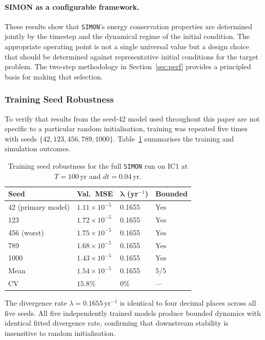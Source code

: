 \documentclass[12pt]{article}
\begin{document}
\paragraph{SIMON as a configurable framework.}
These results show that \texttt{SIMON}'s energy conservation
properties are determined jointly by the timestep and the dynamical
regime of the initial condition. The appropriate operating point is
not a single universal value but a design choice that should be
determined against representative initial conditions for the target
problem. The two-step methodology in Section~\ref{sec:perf} provides
a principled basis for making that selection.

\subsubsection{Training Seed Robustness}
\label{sec:seed_robustness}

To verify that results from the seed-42 model used throughout this paper are
not specific to a particular random initialisation, training was repeated five times
with seeds $\{42, 123, 456, 789, 1000\}$. Table~\ref{tab:seeds} summarises the
training and simulation outcomes.

\begin{table}[H]
\centering
\caption{Training seed robustness for the full \texttt{SIMON} run on IC1 at $T=100$\,yr and $dt=0.04$\,yr.}
\label{tab:seeds}
\begin{tabular}{@{}llll@{}}
\toprule
\textbf{Seed} & \textbf{Val.\ MSE} & $\boldsymbol{\lambda}$ (yr$^{-1}$) & \textbf{Bounded} \\
\midrule
42 (primary model) & $1.11\times10^{-5}$ & 0.1655 & Yes \\
123                & $1.72\times10^{-5}$ & 0.1655 & Yes \\
456 (worst)        & $1.75\times10^{-5}$ & 0.1655 & Yes \\
789                & $1.68\times10^{-5}$ & 0.1655 & Yes \\
1000               & $1.43\times10^{-5}$ & 0.1655 & Yes \\
\midrule
Mean               & $1.54\times10^{-5}$ & 0.1655 & 5/5 \\
CV                 & $15.8\%$            & $0\%$  & --- \\
\bottomrule
\end{tabular}
\end{table}

The divergence rate $\lambda = 0.1655$\,yr$^{-1}$ is identical to four decimal places across all five seeds. All five independently trained models produce bounded dynamics with identical fitted divergence rate, confirming that downstream stability is insensitive to random initialisation.
\end{document}
